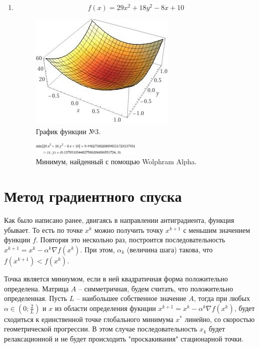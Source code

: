 \documentclass[12pt]{article}
\begin{document}
\begin{enumerate}
\item \[ f(x) = 29x^2+18y^2-8x+10 \]
\begin{figure}[H]
	\centering
	\includegraphics[scale=0.5]{img/func3_plot.jpeg}
	\caption{График функции №3.}
\end{figure}

\begin{figure}[H]
	\centering
	\includegraphics[width=0.5\textwidth]{img/func3_min.jpeg}
	\caption{Минимум, найденный с помощью Wolphram Alpha.}
\end{figure}

\end{enumerate}

\newpage
\section{Метод градиентного спуска}

Как было написано ранее, двигаясь в направлении антиградиента, функция убывает. То есть по точке $x^k$ можно получить точку $x^{k+1}$ с меньшим значением функции $f$. Повторяя это нескольно раз, построится последовательность $x^{k+1} = x^{k} - \alpha^{k} \nabla f(x^k)$. При этом, $\alpha_k$ (величина шага) такова, что $f(x^{k+1}) < f(x^k)$.  

Точка является миниумом, если в ней квадратичная форма положительно определена. Матрица $A$ -- симметричная, будем считать, что положительно определенная. Пусть $L$ -- наибольшее собственное значение $A$, тогда при любых $\alpha \in \left(0; \frac{2}{L} \right)$ и $x$ из области определения фукнции $x^{k+1} = x^{k} - \alpha^{k} \nabla f(x^k)$, будет сходиться к единственной точке глобального минимума $x^*$ линейно, со скоростью геометрической прогрессии. В этом случае последовательность $x_k$ будет релаксационной и не будет происходить "проскакивания" стационарной точки.
\end{document}
